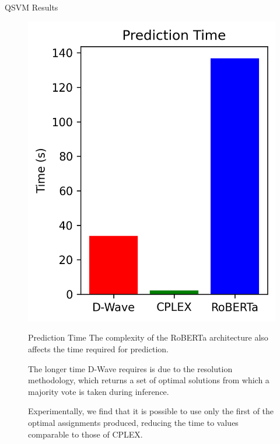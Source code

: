 \begin{block}{QSVM Results}
    \begin{figure}[h!]
        \centering
        \begin{minipage}{0.3\textwidth}
            \centering
            \includegraphics[height=0.14\textheight]{logos/prediction.png}
        \end{minipage}%
        \hfill
        \begin{minipage}{0.65\textwidth}
            \begin{alertblock}{Prediction Time}
                The complexity of the RoBERTa architecture also affects the time required for prediction.

                The longer time D-Wave requires is due to the resolution methodology, which returns a set of optimal solutions from which a majority vote is taken during inference.

                Experimentally, we find that it is possible to use only the first of the optimal assignments produced, reducing the time to values comparable to those of CPLEX.
            \end{alertblock}
        \end{minipage}
    \end{figure}
\end{block}